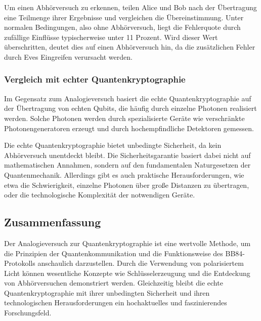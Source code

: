 Um einen Abhörversuch zu erkennen, teilen Alice und Bob nach der Übertragung eine Teilmenge ihrer Ergebnisse und vergleichen die Übereinstimmung. Unter normalen Bedingungen, also ohne Abhörversuch, liegt die Fehlerquote durch zufällige Einflüsse typischerweise unter 11 Prozent. Wird dieser Wert überschritten, deutet dies auf einen Abhörversuch hin, da die zusätzlichen Fehler durch Eves Eingreifen verursacht werden.

\subsubsection{Vergleich mit echter Quantenkryptographie}
Im Gegensatz zum Analogieversuch basiert die echte Quantenkryptographie auf der Übertragung von echten Qubits, die häufig durch einzelne Photonen realisiert werden. Solche Photonen werden durch spezialisierte Geräte wie verschränkte Photonengeneratoren erzeugt und durch hochempfindliche Detektoren gemessen. 

Die echte Quantenkryptographie bietet unbedingte Sicherheit, da kein Abhörversuch unentdeckt bleibt. Die Sicherheitsgarantie basiert dabei nicht auf mathematischen Annahmen, sondern auf den fundamentalen Naturgesetzen der Quantenmechanik. Allerdings gibt es auch praktische Herausforderungen, wie etwa die Schwierigkeit, einzelne Photonen über große Distanzen zu übertragen, oder die technologische Komplexität der notwendigen Geräte.

\subsection{Zusammenfassung}
Der Analogieversuch zur Quantenkryptographie ist eine wertvolle Methode, um die Prinzipien der Quantenkommunikation und die Funktionsweise des BB84-Protokolls anschaulich darzustellen. Durch die Verwendung von polarisiertem Licht können wesentliche Konzepte wie Schlüsselerzeugung und die Entdeckung von Abhörversuchen demonstriert werden. Gleichzeitig bleibt die echte Quantenkryptographie mit ihrer unbedingten Sicherheit und ihren technologischen Herausforderungen ein hochaktuelles und faszinierendes Forschungsfeld.
